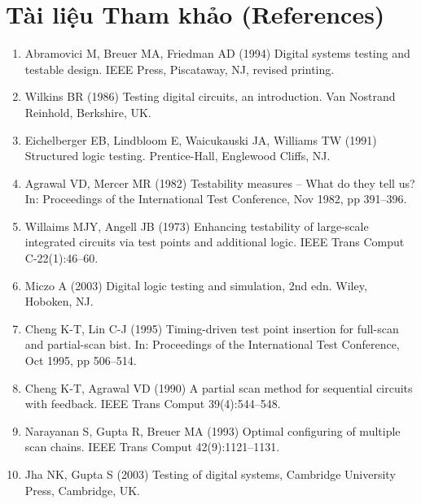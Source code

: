 \section*{Tài liệu Tham khảo (References)}
\begin{enumerate}
    \item Abramovici M, Breuer MA, Friedman AD (1994) Digital systems testing and testable design. IEEE Press, Piscataway, NJ, revised printing.
    \item Wilkins BR (1986) Testing digital circuits, an introduction. Van Nostrand Reinhold, Berkshire, UK.
    \item Eichelberger EB, Lindbloom E, Waicukauski JA, Williams TW (1991) Structured logic testing. Prentice-Hall, Englewood Cliffs, NJ.
    \item Agrawal VD, Mercer MR (1982) Testability measures – What do they tell us? In: Proceedings of the International Test Conference, Nov 1982, pp 391–396.
    \item Willaims MJY, Angell JB (1973) Enhancing testability of large-scale integrated circuits via test points and additional logic. IEEE Trans Comput C-22(1):46–60.
    \item Miczo A (2003) Digital logic testing and simulation, 2nd edn. Wiley, Hoboken, NJ.
    \item Cheng K-T, Lin C-J (1995) Timing-driven test point insertion for full-scan and partial-scan bist. In: Proceedings of the International Test Conference, Oct 1995, pp 506–514.
    \item Cheng K-T, Agrawal VD (1990) A partial scan method for sequential circuits with feedback. IEEE Trans Comput 39(4):544–548.
    \item Narayanan S, Gupta R, Breuer MA (1993) Optimal configuring of multiple scan chains. IEEE Trans Comput 42(9):1121–1131.
    \item Jha NK, Gupta S (2003) Testing of digital systems, Cambridge University Press, Cambridge, UK.
\end{enumerate}
